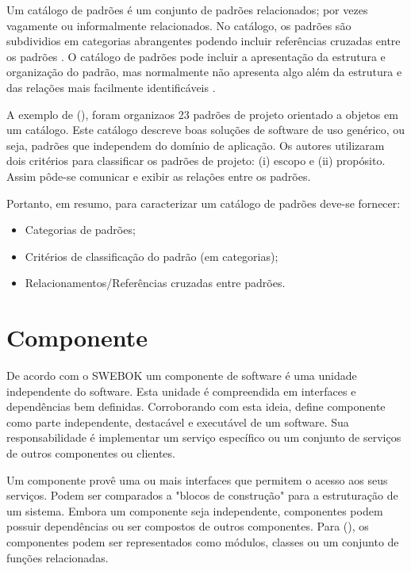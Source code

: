 Um catálogo de padrões é um conjunto de padrões relacionados; por vezes vagamente ou informalmente relacionados. No catálogo, os padrões são subdividios em categorias abrangentes podendo incluir referências cruzadas entre os padrões \cite{appleton1997}. O catálogo de padrões pode incluir a apresentação da estrutura e organização do padrão, mas normalmente não apresenta algo além da estrutura e das relações mais  facilmente identificáveis \cite{appleton1997}.

A exemplo de \citeauthor{gamma1995} (\citeyear{gamma1995}), foram organizaos 23 padrões de projeto orientado a objetos em um catálogo. Este catálogo descreve boas soluções de software de uso genérico, ou seja, padrões que independem do domínio de aplicação. Os autores utilizaram dois critérios para classificar os padrões de projeto: (i) escopo e (ii) propósito. Assim pôde-se comunicar e exibir as relações entre os padrões.

Portanto, em resumo, para caracterizar um catálogo de padrões deve-se fornecer:

\begin{itemize}
    \item Categorias de padrões;
    \item Critérios de classificação do padrão (em categorias);
    \item Relacionamentos/Referências cruzadas entre padrões.
\end{itemize}

\section{Componente}



De acordo com o SWEBOK \cite{swebok} um componente de software é uma unidade independente do software. Esta unidade é compreendida em interfaces e dependências bem definidas. Corroborando com esta ideia, \citeauthor{buschmann2007} define componente como parte independente, destacável e executável de um software. Sua responsabilidade é implementar um serviço específico ou um conjunto de serviços de outros componentes ou clientes. 

Um componente provê uma ou mais interfaces que permitem o acesso aos seus serviços. Podem ser comparados a "blocos de construção" para a estruturação de um sistema. Embora um componente seja independente, componentes podem possuir dependências ou ser compostos de outros componentes. Para \citeauthor{buschmann2007} (\citeyear{buschmann2007}), os componentes podem ser representados como módulos, classes ou um conjunto de funções relacionadas. 

